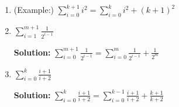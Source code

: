 \documentclass[12pt, letterpaper]{report}
\begin{document}
\begin{enumerate}
\begin{enumerate}

        \item (Example:) $\displaystyle \sum_{i=0}^{k+1}{i^2} = \sum_{i=0}^{k}{i^2} + (k+1)^2$
        \item $\displaystyle \sum_{i=1}^{m+1}{\frac{1}{2^{i-1}}}$ 
        
        \textbf{Solution:}
        $\displaystyle \sum_{i=0}^{m+1}{\frac{1}{2^{i-1}}} = \sum_{i=0}^{m}{\frac{1}{2^{i-1}}} + \frac{1}{2^m}$ 
        
        \item $\displaystyle \sum_{i=0}^{k}{\frac{i+1}{i+2}}$
        
         \textbf{Solution:} $\displaystyle \sum_{i=0}^{k}{\frac{i+1}{i+2}} =  \sum_{i=0}^{k-1}{\frac{i+1}{i+2}} + \frac{k+1}{k+2}$

\end{enumerate}

\end{enumerate}
\end{document}
